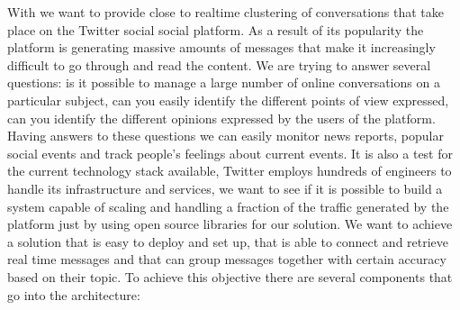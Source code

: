 With \textbf{\project} we want to provide close to realtime 
clustering of conversations that take place on the Twitter social social platform. As a result of its popularity the platform is generating massive amounts of messages that make it increasingly difficult to go through and read the content. We are trying to answer several questions: is it possible to manage a large number of online conversations on a particular subject, can you easily  identify the different points of view expressed, can you identify the different opinions expressed by the users of the platform.
\newline
\newline
Having answers to these questions we can easily monitor news reports, popular social events and track people's feelings about current events. It is also a test for the current technology stack available, Twitter employs hundreds of engineers to handle its infrastructure and services, we want to see if it is possible to build a system capable of scaling and handling a fraction of the traffic generated by the platform just by using open source libraries for our solution.
\newline
\newline
We want to achieve a solution that is easy to deploy and set up, that is able to connect and retrieve real time messages and that can group messages together with certain accuracy based on their topic.
\newline
To achieve this objective there are several components that go into the architecture:
